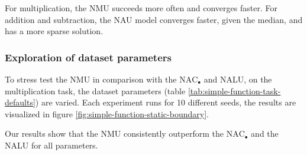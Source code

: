 For multiplication, the NMU succeeds more often and converges faster. For addition and subtraction, the NAU model converges faster, given the median, and has a more sparse solution.



\subsubsection{Exploration of dataset parameters}
To stress test the NMU in comparison with the  $\mathrm{NAC}_{\bullet}$ and NALU, on the multiplication task, the dataset parameters (table \ref{tab:simple-function-task-defaults}) are varied. Each experiment runs for 10 different seeds, the results are visualized in figure \ref{fig:simple-function-static-boundary}.

Our results show that the NMU consistently outperform the $\mathrm{NAC}_{\bullet}$ and the NALU for all parameters.

